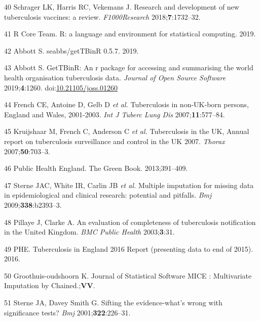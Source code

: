 \documentclass[11pt,twoside]{bristolthesis}
\begin{document}
  \leavevmode\hypertarget{ref-Schrager:2018ip}{}%
  40 Schrager LK, Harris RC, Vekemans J. Research and development of new tuberculosis vaccines: a review. \emph{F1000Research} 2018;\textbf{7}:1732--32.
  
  \leavevmode\hypertarget{ref-RCoreTeam2019}{}%
  41 R Core Team. R: a language and environment for statistical computing. 2019.
  
  \leavevmode\hypertarget{ref-Abbott:2019}{}%
  42 Abbott S. seabbs/getTBinR 0.5.7. 2019.
  
  \leavevmode\hypertarget{ref-Abbott:2018}{}%
  43 Abbott S. GetTBinR: An r package for accessing and summarising the world health organisation tuberculosis data. \emph{Journal of Open Source Software} 2019;\textbf{4}:1260. doi:\href{https://doi.org/10.21105/joss.01260}{10.21105/joss.01260}
  
  \leavevmode\hypertarget{ref-French2007}{}%
  44 French CE, Antoine D, Gelb D \emph{et al.} Tuberculosis in non-UK-born persons, England and Wales, 2001-2003. \emph{Int J Tuberc Lung Dis} 2007;\textbf{11}:577--84.
  
  \leavevmode\hypertarget{ref-Kriujshaar2007}{}%
  45 Kruijshaar M, French C, Anderson C \emph{et al.} Tuberculosis in the UK, Annual report on tuberculosis surveillance and control in the UK 2007. \emph{Thorax} 2007;\textbf{50}:703--3.
  
  \leavevmode\hypertarget{ref-PublicHealthEngland2011a}{}%
  46 Public Health England. The Green Book. 2013;391--409.
  
  \leavevmode\hypertarget{ref-Sterne2009a}{}%
  47 Sterne JAC, White IR, Carlin JB \emph{et al.} Multiple imputation for missing data in epidemiological and clinical research: potential and pitfalls. \emph{Bmj} 2009;\textbf{338}:b2393--3.
  
  \leavevmode\hypertarget{ref-Pillaye2003}{}%
  48 Pillaye J, Clarke A. An evaluation of completeness of tuberculosis notification in the United Kingdom. \emph{BMC Public Health} 2003;\textbf{3}:31.
  
  \leavevmode\hypertarget{ref-PHE2016}{}%
  49 PHE. Tuberculosis in England 2016 Report (presenting data to end of 2015). 2016.
  
  \leavevmode\hypertarget{ref-Groothuis-oudshoorn}{}%
  50 Groothuis-oudshoorn K. Journal of Statistical Software MICE : Multivariate Imputation by Chained.;\textbf{VV}.
  
  \leavevmode\hypertarget{ref-Sterne2001}{}%
  51 Sterne JA, Davey Smith G. Sifting the evidence-what's wrong with significance tests? \emph{Bmj} 2001;\textbf{322}:226--31.
  
\end{document}
